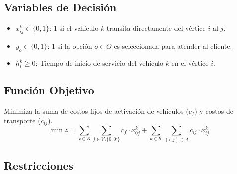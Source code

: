 \documentclass[letter, 10pt]{article}
\begin{document}
\subsection{Variables de Decisión} 
\begin{itemize} 
    \item $x_{ij}^k \in \{0, 1\}$: $1$ si el vehículo $k$ transita directamente del vértice $i$ al $j$. 
    \item $y_o \in \{0, 1\}$: $1$ si la opción $o \in O$ es seleccionada para atender al cliente. 
    \item $h_i^k \ge 0$: Tiempo de inicio de servicio del vehículo $k$ en el vértice $i$. 
\end{itemize} 
\subsection{Función Objetivo} 
Minimiza la suma de costos fijos de activación de vehículos ($c_f$) y costos de transporte ($c_{ij}$). 
\begin{equation} 
    \min z = \sum_{k \in K} \sum_{j \in V \setminus \{0, 0'\}} c_f \cdot x_{0j}^k + \sum_{k \in K} \sum_{(i,j) \in A} c_{ij} \cdot x_{ij}^k \label{eq:objetivo} 
\end{equation} 
\subsection{Restricciones}
\end{document}
